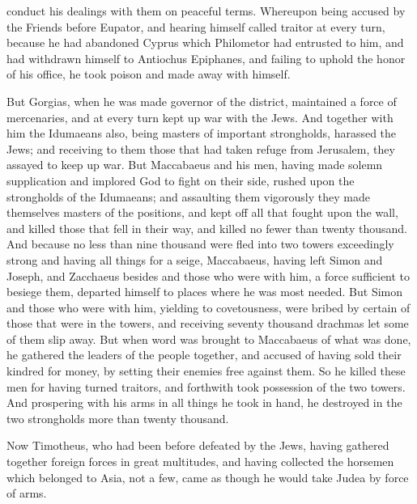{{} conduct his dealings with them on peaceful terms.
Whereupon being accused by the
{}
 Friends before Eupator, and hearing himself called traitor at every turn, because he had abandoned Cyprus which Philometor had entrusted to him, and had withdrawn himself to Antiochus
{} Epiphanes, and
 failing to uphold the honor of his office, he took poison and made away with himself.
\par }{\PP {}But Gorgias, when he was made governor of the district, maintained a force of mercenaries, and at every turn kept up war with the Jews.
And together with him the Idumaeans also, being masters of important strongholds, harassed the Jews; and receiving to them those that had taken refuge
{} from Jerusalem, they assayed to keep up war.
But Maccabaeus and his men, having made solemn supplication and implored God to fight on their side, rushed upon the strongholds of the Idumaeans;
and assaulting them vigorously they made themselves masters of the positions, and kept off all that fought upon the wall, and killed those that fell in their way, and killed no fewer than twenty thousand.
And because no less than nine thousand were fled into two towers exceedingly strong and having all things
{} for a seige,
Maccabaeus, having left Simon and Joseph, and Zacchaeus besides and those who were with him, a force sufficient to besiege them, departed himself to places where he was most needed.
But Simon and those who were with him, yielding to covetousness, were bribed by certain of those that were in the towers, and receiving seventy thousand drachmas let some of them slip away.
But when word was brought to Maccabaeus of what was done, he gathered the leaders of the people together, and accused
{} of having sold their kindred for money, by setting their enemies free
{} against them.
So he killed these men for having turned traitors, and forthwith took possession of the two towers.
And prospering with his arms in all things he took in hand, he destroyed in the two strongholds more than twenty thousand.
\par }{\PP {}Now Timotheus, who had been before defeated by the Jews, having gathered together foreign forces in great multitudes, and having collected the
 horsemen which belonged to Asia, not a few, came as though he would take Judea by force of arms.
}
